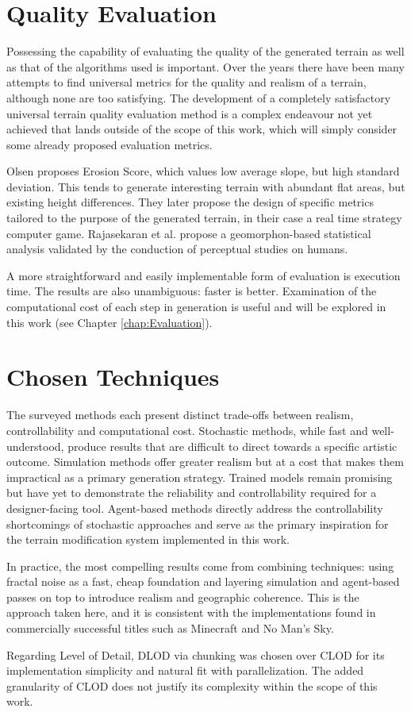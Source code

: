 \section{Quality Evaluation}\label{sec:quality_evaluation}
Possessing the capability of evaluating the quality of the generated terrain as well as that of the algorithms used is important.
Over the years there have been many attempts to find universal metrics for the quality and realism of a terrain, although none are too satisfying.
The development of a completely satisfactory universal terrain quality evaluation method is a complex endeavour not yet achieved that lands outside of the scope of this work, which will simply consider some already proposed evaluation metrics.

Olsen \cite{Olsen:2004:RPT} proposes Erosion Score, which values low average slope, but high standard deviation. 
This tends to generate interesting terrain with abundant flat areas, but existing height differences.
They later propose the design of specific metrics tailored to the purpose of the generated terrain, in their case a real time strategy computer game.
Rajasekaran et al. \cite{Rajasekaran:2019:PTR} propose a geomorphon-based \cite{Jasiewicz:2013:GPR} statistical analysis validated by the conduction of perceptual studies on humans.

A more straightforward and easily implementable form of evaluation is execution time.
The results are also unambiguous: faster is better.
Examination of the computational cost of each step in generation is useful and will be explored in this work (see Chapter \ref{chap:Evaluation}).

\section{Chosen Techniques}
The surveyed methods each present distinct trade-offs between realism, controllability and computational cost. 
Stochastic methods, while fast and well-understood, produce results that are difficult to direct towards a specific artistic outcome. Simulation methods offer greater realism but at a cost that makes them impractical as a primary generation strategy. 
Trained models remain promising but have yet to demonstrate the reliability and controllability required for a designer-facing tool. 
Agent-based methods \cite{Doran:2010:CPT} directly address the controllability shortcomings of stochastic approaches and serve as the primary inspiration for the terrain modification system implemented in this work.

In practice, the most compelling results come from combining techniques: using fractal noise as a fast, cheap foundation and layering simulation and agent-based passes on top to introduce realism and geographic coherence. 
This is the approach taken here, and it is consistent with the implementations found in commercially successful titles such as Minecraft and No Man's Sky.

Regarding Level of Detail, DLOD via chunking was chosen over CLOD for its implementation simplicity and natural fit with parallelization.
The added granularity of CLOD does not justify its complexity within the scope of this work.